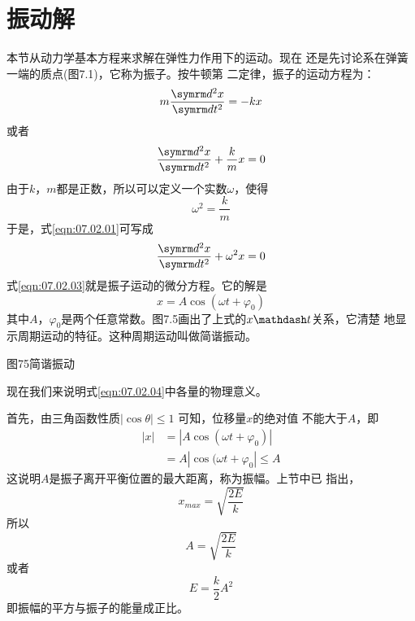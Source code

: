 \section{振动解}\label{sec:07.02}

本节从动力学基本方程来求解在弹性力作用下的运动。现在
还是先讨论系在弹簧一端的质点(图7.1)，它称为振子。按牛顿第
二定律，振子的运动方程为：
\begin{equation*}
	m \frac { \dif ^ { 2 } x } { \dif t ^ { 2 } } = - k x
\end{equation*}
或者
\begin{equation}\label{eqn:07.02.01}
	\frac { \dif ^ { 2 } x } { \dif t ^ { 2 } } + \frac { k } { m } x = 0
\end{equation}
由于$ k $，$ m $都是正数，所以可以定义一个实数$ \omega $，使得
\begin{equation}\label{eqn:07.02.02}
	\omega ^ { 2 } = \frac { k } { m }
\end{equation}
于是，式\eqref{eqn:07.02.01}可写成
\begin{equation}\label{eqn:07.02.03}
	\frac { \dif ^ { 2 } x } { \dif t ^ { 2 } } + \omega ^ { 2 } x = 0
\end{equation}
式\eqref{eqn:07.02.03}就是振子运动的微分方程。它的解是
\begin{equation}\label{eqn:07.02.04}
	x = A \cos ( \omega t + \varphi _ { 0 } )
\end{equation}
其中$ A $，$ \varphi _ { 0 } $是两个任意常数。图7.5画出了上式的$ x \mathdash t $关系，它清楚
地显示周期运动的特征。这种周期运动叫做简谐振动。

图75简谐振动

现在我们来说明式\eqref{eqn:07.02.04}中各量的物理意义。

首先，由三角函数性质$  | \cos \theta | \leqslant 1  $ 可知，位移量$ x $的绝对值
不能大于$ A $，即
\begin{equation*}
	\begin{aligned}
	| x | &= | A \cos ( \omega t + \varphi _ { 0 } ) | \\
		  &= A | \cos ( \omega t + \varphi _ { 0 } | \leqslant A
	\end{aligned}
\end{equation*}
这说明$ A $是振子离开平衡位置的最大距离，称为振幅。上节中已
指出，
\begin{equation*}
	x _ { max } = \sqrt { \frac { 2 E } { k } }
\end{equation*}
所以
\begin{equation*}
	A = \sqrt { \frac { 2 E } { k } }
\end{equation*}
或者
\begin{equation}\label{eqn:07.02.05}
	E = \frac { k } { 2 } A ^ { 2 }
\end{equation}
即振幅的平方与振子的能量成正比。

